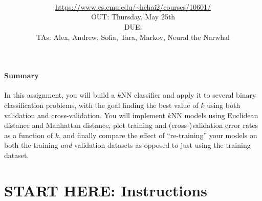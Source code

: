\documentclass[11pt,addpoints,answers]{exam}
\title{\textsc{\hwName}
} %
\author{\courseName\\
\url{https://www.cs.cmu.edu/~hchai2/courses/10601/} \\
OUT: Thursday, May 25th \\
DUE: \dueDate{} \\ 
TAs: Alex, Andrew, Sofia, Tara, Markov, Neural the Narwhal
}
\date{}
\date{}
\begin{document}
\maketitle

\vspace*{-6mm}
\begin{notebox}
\paragraph{Summary} In this assignment, you will build a $k$NN classifier and apply it to several binary classification problems, with the goal finding the best value of $k$ using both validation and cross-validation. You will implement $k$NN models using  Euclidean distance and Manhattan distance, plot training and (cross-)validation error rates as a function of $k$, and finally compare the effect of ``re-training'' your models on both the training \emph{and} validation datasets as opposed to just using the training dataset. 
\end{notebox}
\vspace*{-5mm}\section*{START HERE: Instructions}
\end{document}
